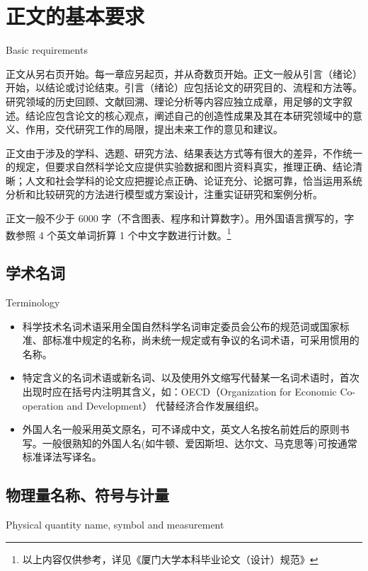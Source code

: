 \chapter{正文的基本要求}{Basic requirements}

正文从另右页开始。每一章应另起页，并从奇数页开始。正文一般从引言（绪论）开始，以结论或讨论结束。引言（绪论）应包括论文的研究目的、流程和方法等。研究领域的历史回顾、文献回溯、理论分析等内容应独立成章，用足够的文字叙述。结论应包含论文的核心观点，阐述自己的创造性成果及其在本研究领域中的意义、作用，交代研究工作的局限，提出未来工作的意见和建议。

正文由于涉及的学科、选题、研究方法、结果表达方式等有很大的差异，不作统一的规定，但要求自然科学论文应提供实验数据和图片资料真实，推理正确、结论清晰；人文和社会学科的论文应把握论点正确、论证充分、论据可靠，恰当运用系统分析和比较研究的方法进行模型或方案设计，注重实证研究和案例分析。

正文一般不少于 6000 字（不含图表、程序和计算数字）。用外国语言撰写的，字数参照 4 个英文单词折算 1 个中文字数进行计数。\footnote{以上内容仅供参考，详见《厦门大学本科毕业论文（设计）规范》}


\section{学术名词}{Terminology}

\begin{itemize}
	\item  科学技术名词术语采用全国自然科学名词审定委员会公布的规范词或国家标准、部标准中规定的名称，尚未统一规定或有争议的名词术语，可采用惯用的名称。
	\item 特定含义的名词术语或新名词、以及使用外文缩写代替某一名词术语时，首次出现时应在括号内注明其含义，如：OECD（Organization for Economic Co-operation and Development）
代替经济合作发展组织。
\item  外国人名一般采用英文原名，可不译成中文，英文人名按名前姓后的原则书写。一般很熟知的外国人名(如牛顿、爱因斯坦、达尔文、马克思等)可按通常标准译法写译名。

\end{itemize}



\section{物理量名称、符号与计量}{Physical quantity name, symbol and measurement}


